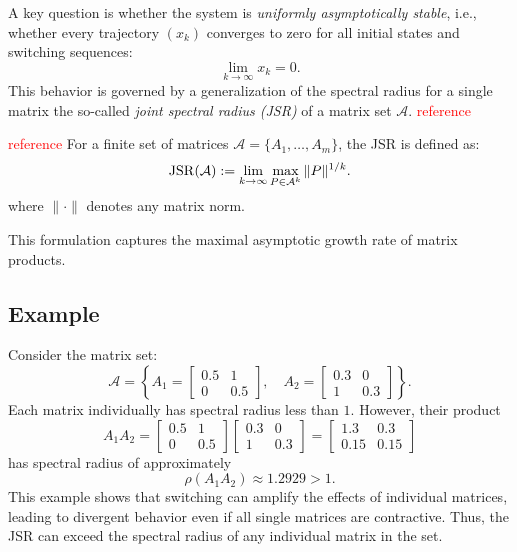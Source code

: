 A key question is whether the system is \emph{uniformly asymptotically stable}, i.e., whether every trajectory $(x_k)$ converges to zero for all initial states and switching sequences:
\[
\lim_{k \to \infty} x_k = 0.
\]
This behavior is governed by a generalization of the spectral radius for a single matrix the so-called \emph{joint spectral radius (JSR)} of a matrix set $\mathcal{A}$. \textcolor{red}{reference}
\begin{definition}
    \textcolor{red}{reference}
    For a finite set of matrices $\mathcal{A} = \{A_1, \dots, A_m\}$, the JSR is defined as:
    \begin{equation} \label{eq:jsr_def}
        \operatorname{JSR}(\mathcal{A}) := \lim_{k \to \infty} \max_{P \in \mathcal{A}^k}  \|P\|^{1/k}.
    \end{equation}
    where $\|\cdot\|$ denotes any matrix norm.
\end{definition}
This formulation captures the maximal asymptotic growth rate of matrix products.

\subsection*{Example}

Consider the matrix set:
\[
\mathcal{A} = \left\{ A_1 = 
\begin{bmatrix}
0.5 & 1 \\
0 & 0.5
\end{bmatrix}, \quad
A_2 =
\begin{bmatrix}
0.3 & 0 \\
1 & 0.3
\end{bmatrix}
\right\}.
\]
Each matrix individually has spectral radius less than $1$. However, their product
\[
A_1 A_2 =
\begin{bmatrix}
0.5 & 1 \\
0 & 0.5
\end{bmatrix}
\begin{bmatrix}
0.3 & 0 \\
1 & 0.3
\end{bmatrix}
=
\begin{bmatrix}
1.3 & 0.3 \\
0.15 & 0.15
\end{bmatrix}
\]
has spectral radius of approximately
\[
\rho(A_1 A_2) \approx 1.2929 > 1.
\]
This example shows that switching can amplify the effects of individual matrices, leading to divergent behavior even if all single matrices are contractive. Thus, the JSR can exceed the spectral radius of any individual matrix in the set.

